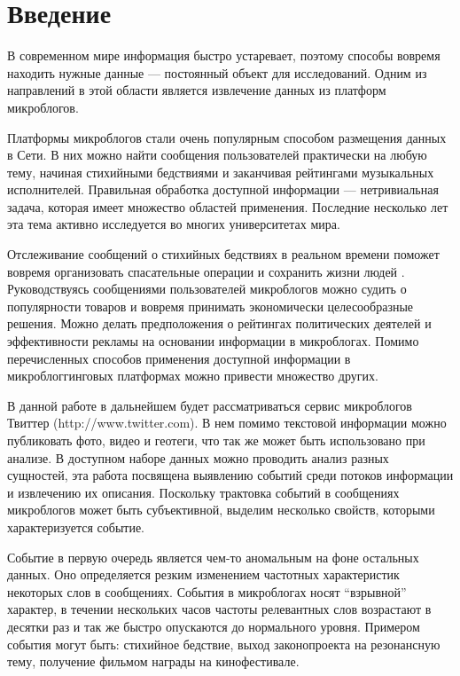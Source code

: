 \documentclass[12pt, a4paper]{article}
\begin{document}
\newpage

\tableofcontents
\thispagestyle{empty}\newpage

  \section*{Введение}
  	В современном мире информация быстро устаревает, поэтому способы вовремя находить нужные данные --- постоянный объект для исследований. Одним из направлений в этой области является извлечение данных из платформ микроблогов.
  	
  	Платформы микроблогов стали очень популярным способом размещения данных в Сети. В них можно найти сообщения пользователей практически на любую тему, начиная стихийными бедствиями и заканчивая рейтингами музыкальных исполнителей. Правильная обработка доступной информации --- нетривиальная задача, которая имеет множество областей применения. Последние несколько лет эта тема активно исследуется во многих университетах мира.
  	
	Отслеживание сообщений о стихийных бедствиях в реальном времени поможет вовремя организовать спасательные операции и сохранить жизни людей \cite{nuggets}. Руководствуясь сообщениями пользователей микроблогов можно судить о популярности товаров и вовремя принимать экономически целесообразные решения. Можно делать предположения о рейтингах политических деятелей и эффективности рекламы на основании информации в микроблогах. Помимо перечисленных способов применения доступной информации в микроблоггинговых платформах можно привести множество других.
	
	В данной работе в дальнейшем будет рассматриваться сервис микроблогов Твиттер (http://www.twitter.com). В нем помимо текстовой информации можно публиковать фото, видео и геотеги, что так же может быть использовано при анализе. В доступном наборе данных можно проводить анализ разных сущностей, эта работа посвящена выявлению событий среди потоков информации и извлечению их описания. Поскольку трактовка событий в сообщениях микроблогов может быть субъективной, выделим несколько свойств, которыми характеризуется событие.
	
	Событие в первую очередь является чем-то аномальным на фоне остальных данных. Оно определяется резким изменением частотных характеристик некоторых слов в сообщениях. События в микроблогах носят ``взрывной'' характер, в течении нескольких часов частоты релевантных слов возрастают в десятки раз и так же быстро опускаются до нормального уровня. Примером события могут быть: стихийное бедствие, выход законопроекта на резонансную тему, получение фильмом награды на кинофестивале.
	
\end{document}
